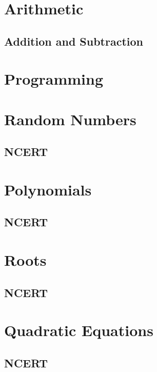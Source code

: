 \documentclass[journal]{IEEEtran}
\begin{document}
\newpage


\tableofcontents

\newpage
\onecolumn


\renewcommand{\thetable}{\theenumi}

\section{Arithmetic}
\subsection{Addition and Subtraction}

\section{Programming}

\section{Random Numbers}

\iffalse
\subsection{NCERT}

\section{Polynomials}
\subsection{NCERT}

\section{Roots}
\subsection{NCERT}

\section{Quadratic Equations}
\subsection{NCERT}

\end{document}
